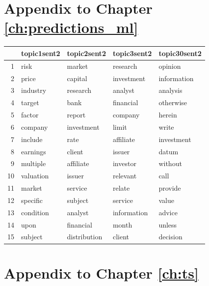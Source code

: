 
\section{Appendix to Chapter \ref{ch:predictions_ml}}

\begin{table}[ht]
\centering
\begin{tabular}{rllll}
  \hline
 & topic1sent2 & topic2sent2 & topic3sent2 & topic30sent2 \\ 
  \hline
1 & risk & market & research & opinion \\ 
  2 & price & capital & investment & information \\ 
  3 & industry & research & analyst & analysis \\ 
  4 & target & bank & financial & otherwise \\ 
  5 & factor & report & company & herein \\ 
  6 & company & investment & limit & write \\ 
  7 & include & rate & affiliate & investment \\ 
  8 & earnings & client & issuer & datum \\ 
  9 & multiple & affiliate & investor & without \\ 
  10 & valuation & issuer & relevant & call \\ 
  11 & market & service & relate & provide \\ 
  12 & specific & subject & service & value \\ 
  13 & condition & analyst & information & advice \\ 
  14 & upon & financial & month & unless \\ 
  15 & subject & distribution & client & decision \\ 
   \hline
\end{tabular}\label{tab:postProbSent2}
\end{table}





\section{Appendix to Chapter \ref{ch:ts}}

